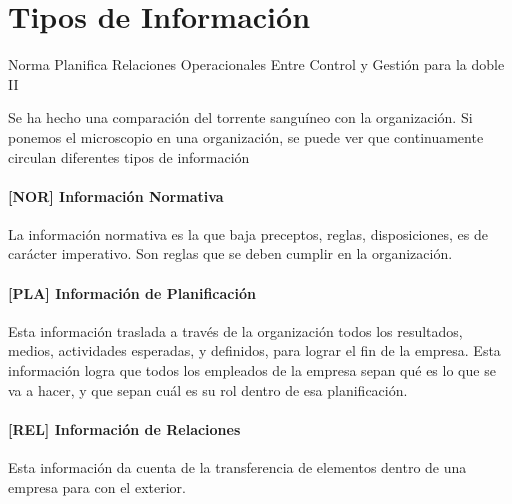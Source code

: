 
\hypertarget{tipos-de-informaciuxf3n}{%
\section{Tipos de Información }\label{tipos-de-informaciuxf3n}}

{\tiny
Norma Planifica Relaciones Operacionales Entre Control y Gestión para la doble II
}


Se ha hecho una comparación del torrente sanguíneo con la organización.
Si ponemos el microscopio en una organización, se puede ver que
continuamente circulan diferentes tipos de información

\hypertarget{informaciuxf3n-normativa}{%
\paragraph{[NOR] Información Normativa}\label{informaciuxf3n-normativa}}
La información normativa es la que baja preceptos, reglas,
disposiciones, es de carácter imperativo. Son reglas que se deben
cumplir en la organización.

\hypertarget{informaciuxf3n-de-planificaciuxf3n}{%
\paragraph{[PLA] Información de
Planificación}\label{informaciuxf3n-de-planificaciuxf3n}}
Esta información traslada a través de la organización todos los
resultados, medios, actividades esperadas, y definidos, para lograr el
fin de la empresa. Esta información logra que todos los empleados de la
empresa sepan qué es lo que se va a hacer, y que sepan cuál es su rol
dentro de esa planificación.

\hypertarget{informaciuxf3n-de-relaciones}{%
\paragraph{[REL] Información de
Relaciones}\label{informaciuxf3n-de-relaciones}}
Esta información da cuenta de la transferencia de elementos dentro de
una empresa para con el exterior.

